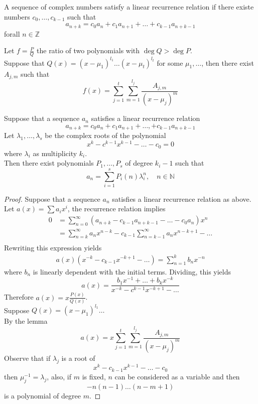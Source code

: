 \documentclass[../main.tex]{subfiles}
\begin{document}
\begin{defn}
	A sequence of complex numbers satisfy a linear recurrence relation if there existe numbers $c_0, \ldots, c_{k-1} $ such that
	\[ 
	a_{n+k} = c_0 a_n + c_1 a_{n+1}  + \ldots +c_{k-1} a_{n+k-1} 
	\]
	forall $n \in \mathbb{Z}$
	
\end{defn}
\begin{lemma}
Let $f= \frac{P}{Q}$ the ratio of two polynomials with $\deg Q > \deg P$.\\
Suppose that $Q( x) = ( x-\mu_1)^{l_1} \ldots ( x- \mu_t ) ^{l_t}$ for some $\mu_1, \ldots$, then there exist  $A_{j,m} $ such that
\[ 
	f( x) = \sum_{j=1}^{ t} \sum_{m=1}^{ l_j}\frac{A_{j,m} }{( x- \mu_j)^{m}}
\]
\end{lemma}

\begin{thm}
	Suppose that a sequence $a_n$ satisfies a linear recurrence relation 
	\[ 
	a_{n+k}  = c_0 a_n + c_1 a_{n+1 } + \ldots, + c_{k-1}  a_{n+k-1} 
	\]
	 Let $\lambda_1, \ldots, \lambda_s$ be the complex roots of the polynomial
	 \[ 
	 x^{k} - c^{k-1}x^{k-1} - \ldots - c_0 = 0
	 \]
	 where $\lambda_i$ as multiplicity $k_i$.\\
	 Then there exist polynomials $P_1, \ldots, P_s$ of degree  $k_i-1$ such that
	 \[ 
		 a_n = \sum_{i=1}^{ s}P_i( n) \lambda_i ^{n}, \quad n \in \mathbb{N}
	 \]
	 
	
\end{thm}
\begin{proof}
Suppose that a sequence $a_n$ satisfies a linear recurrence relation as above.\\
Let $a( x) = \sum a_i x^{i}$, the recurrence relation implies
\begin{align*}
	0 &= \sum_{n=0}^{ \infty } \left( a_{n+k} - c_{k-1} a_{n+k-1}  - \ldots -c_0 a_n \right) x^{n}\\
	  &= \sum_{n=k}^{ \infty }a_n x^{n-k} - c_{k-1}  \sum_{n=k-1}^{ \infty } a_n x^{n-k+1} - \ldots\\
\end{align*}
Rewriting this expression yields
\begin{align*}
	a( x) ( x^{-k}- c_{k-1} x^{-k+1}- \ldots) = \sum_{n=1}^{k} b_n x^{-n}
\end{align*}
where $b_n$ is linearly dependent with the initial terms.
Dividing, this yields
\[ 
	a( x) = \frac{b_1 x^{-1} + \ldots + b_k x^{-k}}{x^{-k} - c^{k-1}x^{-k+1}- \ldots}
\]
Therefore $a( x) = x \frac{P( x) }{Q( x) }$.\\
Suppose $Q( x) = ( x- \mu_1)^{l_1}\ldots$\\
By the lemma
\[ 
	a( x) = x \sum_{j=1}^{ t} \sum_{m=1}^{ l_j} \frac{A_{j,m} }{( x-\mu_j)^{m}}
\]
Observe that if $\lambda_j$ is a root of
\[ 
x^{k} - c_{k-1} x^{k-1} - \ldots - c_0 
\]
then $\mu_j^{-1}= \lambda_j$, also, if $m$ is fixed, $n$ can be considered as a variable and then
\[ 
	-n ( n-1) \ldots ( n-m+1)  
\]
is a polynomial of degree $m$.



\end{proof}
\end{document}
